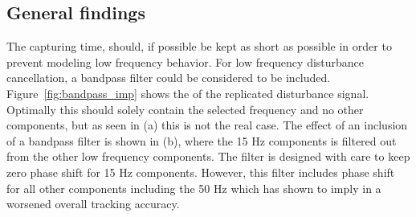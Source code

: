 \FloatBarrier
\subsection{General findings}\label{subsec:longterm}
The capturing time, should, if possible be kept as short as possible in order to prevent modeling low frequency behavior. For low frequency disturbance cancellation, a bandpass filter could be considered to be included. Figure~\ref{fig:bandpass_imp} shows the \abbrFFT of the replicated disturbance signal. Optimally this should solely contain the selected frequency and no other components, but as seen in (a) this is not the real case. The effect of an inclusion of a bandpass filter is shown in (b), where the 15 Hz components is filtered out from the other low frequency components. The filter is designed with care to keep zero phase shift for 15 Hz components. However, this filter includes phase shift for all other components including the 50 Hz which has shown to imply in a worsened overall tracking accuracy.

